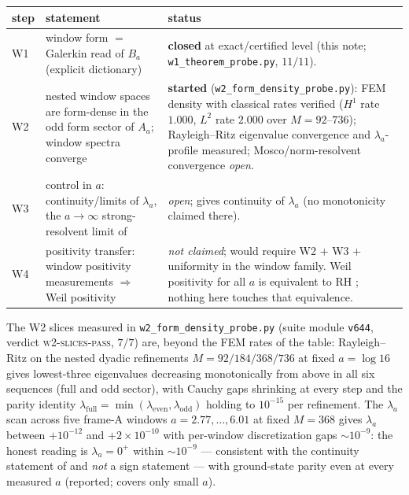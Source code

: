\documentclass[11pt,a4paper]{article}
\theoremstyle{remark}
\begin{document}
\begin{center}
\small
\begin{tabular}{@{}p{}p{}p{}@{}}
\toprule
step & statement & status\\
\midrule
W1 & window form $=$ Galerkin read of $B_a$ (explicit dictionary)
& \textbf{closed} at exact/certified level (this note;
\texttt{w1\_theorem\_probe.py}, $11/11$).\\
W2 & nested window spaces are form-dense in the odd form sector of
$A_a$; window spectra converge & \textbf{started}
(\texttt{w2\_form\_density\_probe.py}): FEM density with classical
rates verified ($H^1$ rate $1.000$, $L^2$ rate $2.000$ over
$M=92$--$736$); Rayleigh--Ritz eigenvalue convergence and
$\lambda_a$-profile measured; Mosco/norm-resolvent convergence
\emph{open}.\\
W3 & control in $a$: continuity/limits of $\lambda_a$, the
$a\to\infty$ strong-resolvent limit of \cite[Sec.~7]{Suz26}
& \emph{open}; \cite[Thm.~1.3]{Suz26} gives continuity of
$\lambda_a$ (no monotonicity claimed there).\\
W4 & positivity transfer: window positivity measurements
$\Rightarrow$ Weil positivity & \emph{not claimed}; would require
W2 $+$ W3 $+$ uniformity in the window family.  Weil positivity for
all $a$ is equivalent to RH \cite{Weil52,Yoshida92}; nothing here
touches that equivalence.\\
\bottomrule
\end{tabular}
\end{center}

The W2 slices measured in \texttt{w2\_form\_density\_probe.py} (suite
module \texttt{v644}, verdict \textsc{w2-slices-pass}, $7/7$) are,
beyond the FEM rates of the table: Rayleigh--Ritz on the nested dyadic
refinements $M=92/184/368/736$ at fixed $a=\log16$ gives lowest-three
eigenvalues decreasing monotonically from above in all six sequences
(full and odd sector), with Cauchy gaps shrinking at every step and
the parity identity $\lambda_{\mathrm{full}}
=\min(\lambda_{\mathrm{even}},\lambda_{\mathrm{odd}})$ holding to
$10^{-15}$ per refinement.  The $\lambda_a$ scan across five frame-A
windows $a=2.77,\dots,6.01$ at fixed $M=368$ gives $\lambda_a$ between
$+10^{-12}$ and $+2\times10^{-10}$ with per-window discretization gaps
$\sim10^{-9}$: the honest reading is $\lambda_a=0^+$ within
$\sim10^{-9}$ --- consistent with the continuity statement of
\cite[Thm.~1.3]{Suz26} and \emph{not} a sign statement --- with
ground-state parity even at every measured $a$ (reported;
\cite[Thm.~1.4]{Suz26} covers only small $a$).
\end{document}
